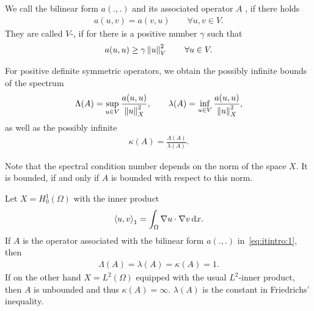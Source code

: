 \begin{definition}
  We call the bilinear form $a(.,.)$ and its associated operator $A$
  , if there holds
  \begin{gather*}
    a(u,v) = a(v,u) \qquad \forall u,v \in V.
  \end{gather*}
  They are called $V$-, if for there is a positive number
  $\gamma$ such that
  \begin{gather*}
    a(u,u) \ge \gamma \left\|u\right\|_V^2 \qquad \forall u\in V.
  \end{gather*}
\end{definition}

\begin{definition}
  For positive definite symmetric operators, we obtain the possibly
  infinite bounds of the spectrum
  \begin{gather}
    \label{eq:richardson:8}
    \Lambda(A) = \sup_{u\in V}\frac{a(u,u)}{\left\|u\right\|_X^2},
    \qquad
    \lambda(A) = \inf_{u\in V}\frac{a(u,u)}{\left\|u\right\|_X^2},
  \end{gather}
  as well as the possibly infinite 
  \begin{gather*}
   \kappa(A) = \frac{\Lambda(A)}{\lambda(A)}.
  \end{gather*}
\end{definition}

\begin{note}
  Note that the spectral condition number depends on the norm of the
  space $X$. It is bounded, if and only if $A$ is bounded with respect
  to this norm.
\end{note}

\begin{example}
  Let $X=H^1_0(\Omega)$ with the inner product
  \begin{gather*}
    \scal(u,v)_1 = \int_\Omega \nabla u\cdot \nabla v \dx.  
  \end{gather*}
  If $A$ is the operator associated with the bilinear form $a(.,.)$
  in~\eqref{eq:itintro:1}, then 
  \begin{gather*}
    \Lambda(A) = \lambda(A) = \kappa(A) = 1.    
  \end{gather*}
  If on the other hand $X = L^2(\Omega)$ equipped with the usual
  $L^2$-inner product, then $A$ is unbounded and thus $\kappa(A) =
  \infty$. $\lambda(A)$ is the constant in Friedrichs' inequality.
\end{example}

